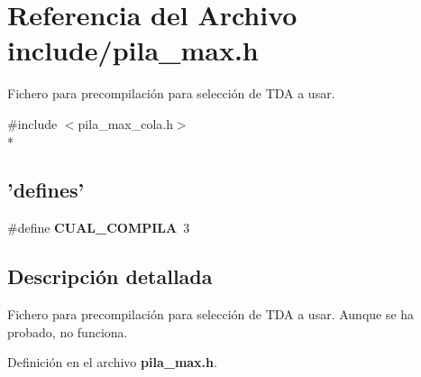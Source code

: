 \section{Referencia del Archivo include/pila\-\_\-max.h}
\label{pila__max_8h}


Fichero para precompilación para selección de T\-D\-A a usar.  


{\ttfamily \#include $<$pila\-\_\-max\-\_\-cola.\-h$>$}\\*
\subsection*{'defines'}
\begin{DoxyCompactItemize}
\item 
\#define {\bfseries C\-U\-A\-L\-\_\-\-C\-O\-M\-P\-I\-L\-A}~3\label{pila__max_8h_a5ee137079c448f8e19ee449bd929fa1e}

\end{DoxyCompactItemize}


\subsection{Descripción detallada}
Fichero para precompilación para selección de T\-D\-A a usar. Aunque se ha probado, no funciona. 

Definición en el archivo {\bf pila\-\_\-max.\-h}.

